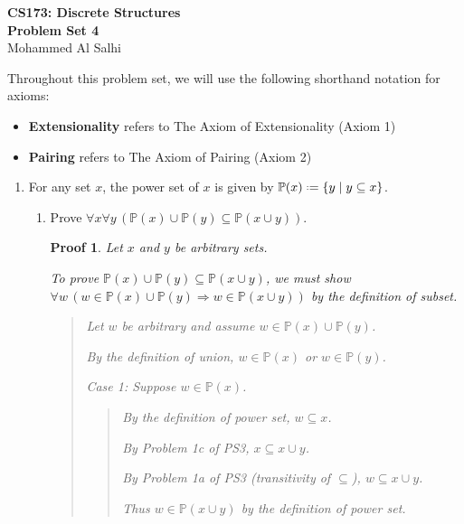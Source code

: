 \documentclass[12pt]{article}
\newcommand{\defeq}{\mathrel{\vcenter{\baselineskip0.5ex \lineskiplimit0pt
                     \hbox{\scriptsize.}\hbox{\scriptsize.}}}=}
\newcommand{\Pow}{\mathbb{P}}
\theoremstyle{proofstyle}
\newtheorem*{proof*}{Proof}
\renewcommand{\maketitle}{%
  \begin{flushleft}
    {\Large\bfseries CS173: Discrete Structures}\\[0.3em]
    {\Large\bfseries Problem Set 4}\\[0.5em]
    {\normalsize Mohammed Al Salhi}
  \end{flushleft}
  \vspace{1em}
}
\begin{document}
\maketitle

\noindent
Throughout this problem set, we will use the following shorthand notation for axioms:
\begin{itemize}
    \item \textbf{Extensionality} refers to The Axiom of Extensionality (Axiom 1)
    \item \textbf{Pairing} refers to The Axiom of Pairing (Axiom 2)
\end{itemize}

\begin{enumerate}[left=0pt, itemsep=2em, parsep=1em]

\item For any set $x$, the power set of $x$ is given by $\Pow(x) \defeq \{y \mid y \subseteq x\}$.

\begin{enumerate}[label=(\alph*), itemsep=1.5em, leftmargin=2em]

\item Prove $\forall x \forall y\,(\Pow(x) \cup \Pow(y) \subseteq \Pow(x \cup y))$.

\begin{proof*}
    Let $x$ and $y$ be arbitrary sets.

    To prove $\Pow(x) \cup \Pow(y) \subseteq \Pow(x \cup y)$, we must show $\forall w\,(w \in \Pow(x) \cup \Pow(y) \Rightarrow w \in \Pow(x \cup y))$ by the definition of subset.

    \begin{quote}
        Let $w$ be arbitrary and assume $w \in \Pow(x) \cup \Pow(y)$.

        By the definition of union, $w \in \Pow(x)$ or $w \in \Pow(y)$.

        \textit{Case 1:} Suppose $w \in \Pow(x)$.

        \begin{quote}
            By the definition of power set, $w \subseteq x$.

            By Problem 1c of PS3, $x \subseteq x \cup y$.

            By Problem 1a of PS3 (transitivity of $\subseteq$), $w \subseteq x \cup y$.

            Thus $w \in \Pow(x \cup y)$ by the definition of power set.
        \end{quote}


\end{quote}
\end{proof*}
\end{enumerate}
\end{enumerate}
\end{document}
